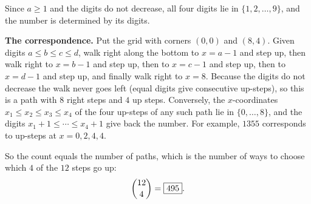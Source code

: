 Since $a\ge1$ and the digits do not decrease, all four digits lie in $\{1,2,\dots,9\}$, and the number is determined by its digits.

\textbf{The correspondence.} Put the grid with corners $(0,0)$ and $(8,4)$. Given digits $a\le b\le c\le d$, walk right along the bottom to $x=a-1$ and step up, then walk right to $x=b-1$ and step up, then to $x=c-1$ and step up, then to $x=d-1$ and step up, and finally walk right to $x=8$. Because the digits do not decrease the walk never goes left (equal digits give consecutive up-steps), so this is a path with $8$ right steps and $4$ up steps. Conversely, the $x$-coordinates $x_1\le x_2\le x_3\le x_4$ of the four up-steps of any such path lie in $\{0,\dots,8\}$, and the digits $x_1+1\le\cdots\le x_4+1$ give back the number. For example, $1355$ corresponds to up-steps at $x=0,2,4,4$.

So the count equals the number of paths, which is the number of ways to choose which $4$ of the $12$ steps go up:
\[
\dbinom{12}{4}=\boxed{495}.
\]
